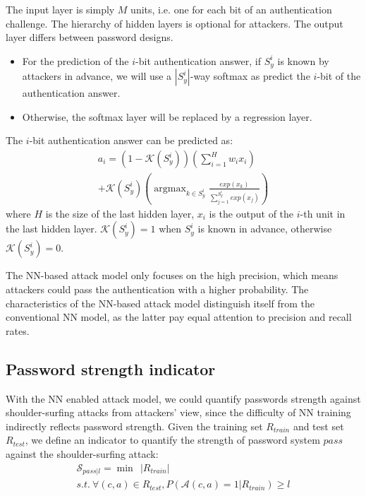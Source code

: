\documentclass{article}
\begin{document}
The input layer is simply $M$ units, i.e. one for each bit of an authentication challenge. The hierarchy of hidden layers is optional for attackers. The output layer differs between password designs.
\begin{itemize} 
  \item For the prediction of the $i$-bit authentication answer, if $S_y^i$ is known by attackers in advance, we will use a $|S_y^i|$-way softmax as predict the $i$-bit
  of the authentication answer.
  \item Otherwise, the softmax layer will be replaced by a regression layer. 
\end{itemize}
  The $i$-bit
  authentication answer can be predicted as:
  \begin{equation}
    \begin{gathered}
    a_i = (1-\mathcal{K}(S_y^i))(\sum_{i=1}^H w_ix_i) \\
    +\mathcal{K} (S_y^i)(\mathop{\arg\max}_{k \in S_y^i}\frac{exp(x_k)}{\sum_{j=1}^{S_y^i}exp(x_j)})
    \end{gathered}
  \end{equation}
  where $H$ is the size of the last hidden layer, $x_i$ is the output of the $i$-th unit in the last hidden layer.
  $\mathcal{K}(S_y^i) = 1$ when $S_y^i$ is known in advance, otherwise $\mathcal{K}(S_y^i) = 0$.




The NN-based attack model only focuses on the high precision, which means attackers could pass the authentication with a higher probability. The characteristics of the NN-based attack model distinguish itself from the conventional NN model, as the latter pay equal attention to precision and recall rates.

\subsection{Password strength indicator}
With the NN enabled attack model, we could quantify passwords strength against shoulder-surfing attacks from attackers' view, since the difficulty of NN training indirectly reflects password strength. Given the training set $R_{train}$ and test set $R_{test}$, we define an indicator to quantify the strength of password system $pass$ against the shoulder-surfing attack:
  \begin{equation}
    \begin{gathered}
    \mathcal{S}_{pass|l} = \mathop{\min}\ \ |R_{train}| \\
    s.t.\
    \forall (c,a) \in R_{test}, P(\mathcal{A}(c,a)=1|R_{train}) \geq l
    \end{gathered}
  \label{equa:indictor}
  \end{equation}
\end{document}
